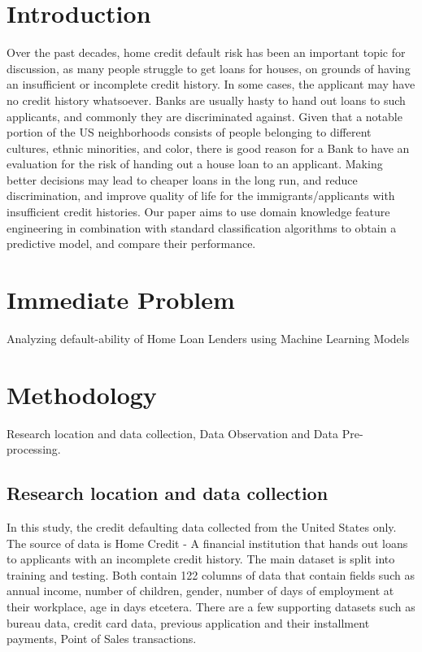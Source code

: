\documentclass[sigconf, nonacm]{acmart}
\begin{document}

\section{Introduction}

Over the past decades, home credit default risk has been an important topic for discussion, as many people struggle to get loans for houses, on grounds of having an insufficient or incomplete credit history. In some cases, the applicant may have no credit history whatsoever. Banks are usually hasty to hand out loans to such applicants, and commonly they are discriminated against. Given that a notable portion of the US neighborhoods consists of people belonging to different cultures, ethnic minorities, and color, there is good reason for a Bank to have an evaluation for the risk of handing out a house loan to an applicant. Making better decisions may lead to cheaper loans in the long run, and reduce discrimination, and improve quality of life for the immigrants/applicants with insufficient credit histories. Our paper aims to use domain knowledge feature engineering in combination with standard classification algorithms to obtain a predictive model, and compare their performance.

\section{Immediate Problem}
Analyzing default-ability of Home Loan Lenders using Machine Learning Models

\section{Methodology}
Research location and data collection, Data Observation and Data Pre-processing.

\subsection{Research location and data collection}

In this study, the credit defaulting data collected from the United States only. The source of data\cite{dataset} is Home Credit - A financial institution that hands out loans to applicants with an incomplete credit history. The main dataset is split into training and testing. Both contain 122 columns of data that contain fields such as annual income, number of children, gender, number of days of employment at their workplace, age in days etcetera. There are a few supporting datasets such as bureau data, credit card data, previous application and their installment payments, Point of Sales transactions.
\end{document}
